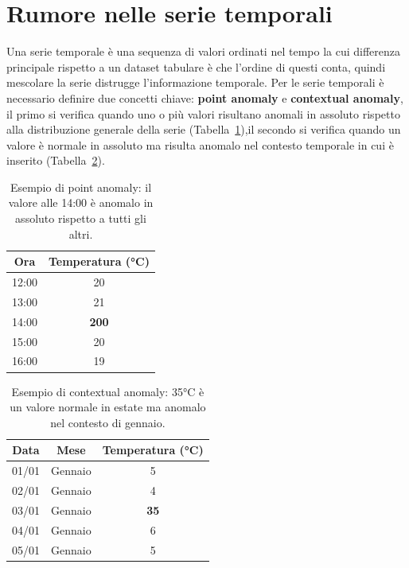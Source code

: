 \documentclass[../main.tex]{subfiles}
\begin{document}
\section{Rumore nelle serie temporali}
Una serie temporale è una sequenza di valori ordinati nel tempo la cui differenza principale rispetto a un dataset tabulare è che l'ordine di questi conta, quindi mescolare la serie distrugge l'informazione temporale.
Per le serie temporali è necessario definire due concetti chiave: \textbf{point anomaly} e \textbf{contextual anomaly}, il primo si verifica quando uno o più valori risultano anomali in assoluto rispetto alla distribuzione generale della serie (Tabella~\ref{tab:pointAnomaly}),il secondo si verifica quando un valore è normale in assoluto ma risulta anomalo nel contesto temporale in cui è inserito (Tabella~\ref{tab:contextualAnomaly}).

\begin{table}[H]
\centering
\begin{tabular}{|c|c|}
\hline
\textbf{Ora} & \textbf{Temperatura (°C)} \\
\hline
12:00 & 20 \\
13:00 & 21 \\
14:00 & \textbf{200} \\
15:00 & 20 \\
16:00 & 19 \\
\hline
\end{tabular}
\caption{Esempio di point anomaly: il valore alle 14:00 
è anomalo in assoluto rispetto a tutti gli altri.}
\label{tab:pointAnomaly}
\end{table}

\begin{table}[H]
\centering
\begin{tabular}{|c|c|c|}
\hline
\textbf{Data} & \textbf{Mese} & \textbf{Temperatura (°C)} \\
\hline
01/01 & Gennaio & 5 \\
02/01 & Gennaio & 4 \\
03/01 & Gennaio & \textbf{35} \\
04/01 & Gennaio & 6 \\
05/01 & Gennaio & 5 \\
\hline
\end{tabular}
\caption{Esempio di contextual anomaly: 35°C è un valore 
normale in estate ma anomalo nel contesto di gennaio.}
\label{tab:contextualAnomaly}
\end{table}
\end{document}
